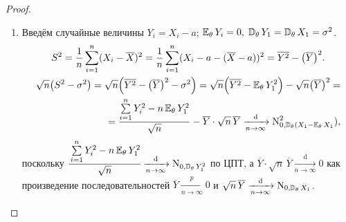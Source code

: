 \begin{proof}
\begin{enumerate}
    \item Введём случайные величины $Y_{i}=X_{i}-a$; $\operatorname{\operatorname{\mathbb{E}}_{\theta}} Y_{i} = 0, \; \operatorname{\mathbb{D}_{\theta}} Y_{1} = \operatorname{\mathbb{D}_{\theta}} X_{1}=\sigma^{2}$.
    \begin{gather*}
        S^{2}=\frac{1}{n} \sum\limits_{i=1}^{n}(X_{i}-\overline{X})^{2}=\frac{1}{n} \sum\limits_{i=1}^{n}(X_{i}-a-(\overline{X}-a))^{2}=\overline{Y^{2}}-\bigl(\overline{Y}\bigr)^{2}. \\
        \begin{aligned}
            \sqrt{n}\bigl(S^{2}-\sigma^{2}\bigr) = \sqrt{n}\Bigl(\overline{Y^{2}}-\bigl(\overline{Y}\bigr)^{2}-\sigma^{2}\Bigr)
            = \sqrt{n}\Bigl(\overline{Y^{2}}-\operatorname{\operatorname{\mathbb{E}}_{\theta}}  Y_{1}^{2} \Bigr) - \sqrt{n}\bigl(\overline{Y}\bigr)^{2} = \\
            =\frac{\sum\limits_{i=1}^{n} Y_{i}^{2}-n \operatorname{\operatorname{\mathbb{E}}_{\theta}}  Y_{1}^{2}}{\sqrt{n}}-\overline{Y} \cdot \sqrt{n} \, \overline{Y} \xrightarrow[n \to \infty]{\text{d}} \operatorname{\mathrm{N}}_{0, \operatorname{\mathbb{D}_{\theta}} (X_{1}-\operatorname{\operatorname{\mathbb{E}}_{\theta}} X_1}^{2}),
    \end{aligned}
    \end{gather*}
    поскольку $\cfrac{\sum\limits_{i=1}^{n} Y_{i}^{2}-n \operatorname{\operatorname{\mathbb{E}}_{\theta}}  Y_{1}^{2}}{\sqrt{n}} \xrightarrow[n \to \infty]{\text{d}} \operatorname{\mathrm{N}}_{0, \operatorname{\mathbb{D}_{\theta}}  Y_{1}^{2}}$ по ЦПТ, 
    а ${\overline{Y} \cdot \sqrt{n} \, \overline{Y} \xrightarrow[n \to \infty]{\text{d}} 0}$ как произведение последовательностей ${\overline{Y} \xrightarrow[n \to \infty]{p} 0}$ и ${\sqrt{n} \, \overline{Y} \xrightarrow[n \to \infty]{\text{d}} \operatorname{\mathrm{N}}_{0, \operatorname{\mathbb{D}_{\theta}}  X_{1}}}$.
\end{enumerate}
\end{proof}

